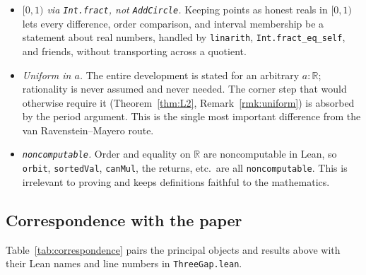 \documentclass[11pt,reqno]{amsart}
\theoremstyle{plain}
\theoremstyle{definition}
\theoremstyle{remark}
\newcommand{\R}{\mathbb{R}}
\newcommand{\code}[1]{\texttt{#1}}
\begin{document}
\begin{itemize}
\item \emph{$[0,1)$ via \code{Int.fract}, not \code{AddCircle}.}  Keeping points
as honest reals in $[0,1)$ lets every difference, order comparison, and interval
membership be a statement about real numbers, handled by \code{linarith},
\code{Int.fract\_eq\_self}, and friends, without transporting across a quotient.
\item \emph{Uniform in $a$.}  The entire development is stated for an arbitrary
$a:\R$; rationality is never assumed and never needed.  The corner step that
would otherwise require it (Theorem~\ref{thm:L2}, Remark~\ref{rmk:uniform}) is
absorbed by the period argument.  This is the single most important difference
from the van Ravenstein--Mayero route.
\item \emph{\code{noncomputable}.}  Order and equality on $\R$ are noncomputable
in Lean, so \code{orbit}, \code{sortedVal}, \code{canMul}, the returns, etc.\ are
all \code{noncomputable}.  This is irrelevant to proving and keeps definitions
faithful to the mathematics.
\end{itemize}

\subsection{Correspondence with the paper}

Table~\ref{tab:correspondence} pairs the principal objects and results above with
their Lean names and line numbers in \code{ThreeGap.lean}.
\end{document}
